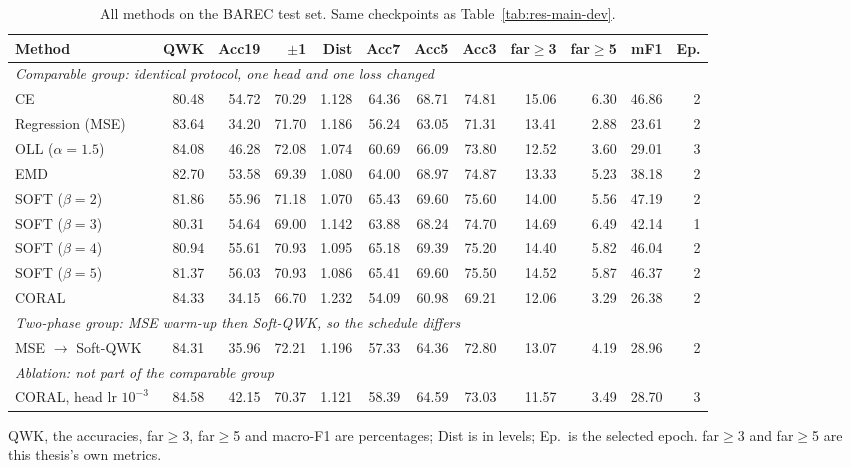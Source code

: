 \begin{table}[H]
\centering
\footnotesize
\caption{All methods on the BAREC test set. Same checkpoints as Table~\ref{tab:res-main-dev}.}
\label{tab:res-main-test}
\begin{tabular}{lrrrrrrrrrrr}
\toprule
\textbf{Method} & \textbf{QWK} & \textbf{Acc19} & \textbf{$\pm$1} & \textbf{Dist} & \textbf{Acc7} & \textbf{Acc5} & \textbf{Acc3} & \textbf{far$\geq$3} & \textbf{far$\geq$5} & \textbf{mF1} & \textbf{Ep.} \\
\midrule
\multicolumn{12}{l}{\textit{Comparable group: identical protocol, one head and one loss changed}} \\
\midrule
CE & 80.48 & 54.72 & 70.29 & 1.128 & 64.36 & 68.71 & 74.81 & 15.06 & 6.30 & 46.86 & 2 \\
Regression (MSE) & 83.64 & 34.20 & 71.70 & 1.186 & 56.24 & 63.05 & 71.31 & 13.41 & 2.88 & 23.61 & 2 \\
OLL ($\alpha=1.5$) & 84.08 & 46.28 & 72.08 & 1.074 & 60.69 & 66.09 & 73.80 & 12.52 & 3.60 & 29.01 & 3 \\
EMD & 82.70 & 53.58 & 69.39 & 1.080 & 64.00 & 68.97 & 74.87 & 13.33 & 5.23 & 38.18 & 2 \\
SOFT ($\beta=2$) & 81.86 & 55.96 & 71.18 & 1.070 & 65.43 & 69.60 & 75.60 & 14.00 & 5.56 & 47.19 & 2 \\
SOFT ($\beta=3$) & 80.31 & 54.64 & 69.00 & 1.142 & 63.88 & 68.24 & 74.70 & 14.69 & 6.49 & 42.14 & 1 \\
SOFT ($\beta=4$) & 80.94 & 55.61 & 70.93 & 1.095 & 65.18 & 69.39 & 75.20 & 14.40 & 5.82 & 46.04 & 2 \\
SOFT ($\beta=5$) & 81.37 & 56.03 & 70.93 & 1.086 & 65.41 & 69.60 & 75.50 & 14.52 & 5.87 & 46.37 & 2 \\
CORAL & 84.33 & 34.15 & 66.70 & 1.232 & 54.09 & 60.98 & 69.21 & 12.06 & 3.29 & 26.38 & 2 \\
\midrule
\multicolumn{12}{l}{\textit{Two-phase group: MSE warm-up then Soft-QWK, so the schedule differs}} \\
\midrule
MSE $\rightarrow$ Soft-QWK & 84.31 & 35.96 & 72.21 & 1.196 & 57.33 & 64.36 & 72.80 & 13.07 & 4.19 & 28.96 & 2 \\
\midrule
\multicolumn{12}{l}{\textit{Ablation: not part of the comparable group}} \\
\midrule
CORAL, head lr $10^{-3}$ & 84.58 & 42.15 & 70.37 & 1.121 & 58.39 & 64.59 & 73.03 & 11.57 & 3.49 & 28.70 & 3 \\
\bottomrule
\end{tabular}

\vspace{0.1cm}
{\footnotesize QWK, the accuracies, far$\geq$3, far$\geq$5 and macro-F1 are percentages; Dist is in levels; Ep.\ is the selected epoch. far$\geq$3 and far$\geq$5 are this thesis's own metrics.}
\end{table}
